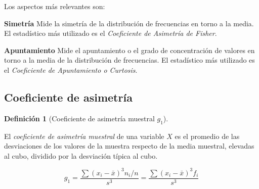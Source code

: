 \documentclass[
  a4paper,
]{scrreport}
\theoremstyle{plain}
\theoremstyle{definition}
\newtheorem{definition}{Definición}[chapter]
\theoremstyle{definition}
\theoremstyle{remark}
\begin{document}
Los aspectos más relevantes son:

\textbf{Simetría} Mide la simetría de la distribución de frecuencias en
torno a la media. El estadístico más utilizado es el \emph{Coeficiente
de Asimetría de Fisher}.

\textbf{Apuntamiento} Mide el apuntamiento o el grado de concentración
de valores en torno a la media de la distribución de frecuencias. El
estadístico más utilizado es el \emph{Coeficiente de Apuntamiento o
Curtosis}.

\subsection{Coeficiente de asimetría}\label{coeficiente-de-asimetruxeda}

\begin{definition}[Coeficiente de asimetría muestral
\(g_1\)]\protect\hypertarget{def-coeficiente-asimetria}{}\label{def-coeficiente-asimetria}

El \emph{coeficiente de asimetría muestral} de una variable \(X\) es el
promedio de las desviaciones de los valores de la muestra respecto de la
media muestral, elevadas al cubo, dividido por la desviación típica al
cubo.

\[g_1 = \frac{\sum (x_i-\bar x)^3 n_i/n}{s^3} = \frac{\sum (x_i-\bar x)^3 f_i}{s^3}\]

\end{definition}
\end{document}
